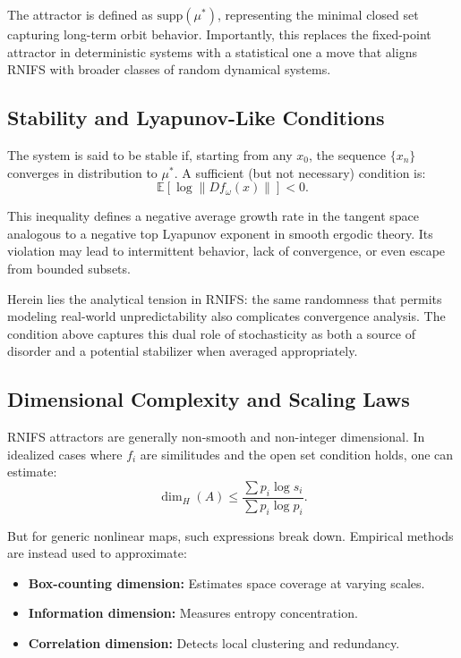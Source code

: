 \documentclass[twocolumn,10pt]{article}
\begin{document}
The attractor is defined as $\text{supp}(\mu^*)$, representing the minimal closed set capturing long-term orbit behavior. Importantly, this replaces the fixed-point attractor in deterministic systems with a statistical one a move that aligns RNIFS with broader classes of random dynamical systems.


\subsection{Stability and Lyapunov-Like Conditions}
\label{subsec:stability}

The system is said to be stable if, starting from any $x_0$, the sequence $\{x_n\}$ converges in distribution to $\mu^*$. A sufficient (but not necessary) condition is:
\begin{equation}
\mathbb{E}[ \log \|Df_{\omega}(x)\| ] < 0.
\label{eq:lyapunov}
\end{equation}

This inequality defines a negative average growth rate in the tangent space analogous to a negative top Lyapunov exponent in smooth ergodic theory. Its violation may lead to intermittent behavior, lack of convergence, or even escape from bounded subsets.

Herein lies the analytical tension in RNIFS: the same randomness that permits modeling real-world unpredictability also complicates convergence analysis. The condition above captures this dual role of stochasticity as both a source of disorder and a potential stabilizer when averaged appropriately.


\subsection{Dimensional Complexity and Scaling Laws}
\label{subsec:dimension}

RNIFS attractors are generally non-smooth and non-integer dimensional. In idealized cases where $f_i$ are similitudes and the open set condition holds, one can estimate:
\begin{equation}
\dim_H(A) \leq \frac{ \sum p_i \log s_i }{ \sum p_i \log p_i }.
\label{eq:hausdorff_bound}
\end{equation}

But for generic nonlinear maps, such expressions break down. Empirical methods are instead used to approximate:

\begin{itemize}
    \item \textbf{Box-counting dimension:} Estimates space coverage at varying scales.
    \item \textbf{Information dimension:} Measures entropy concentration.
    \item \textbf{Correlation dimension:} Detects local clustering and redundancy.
\end{itemize}
\end{document}
